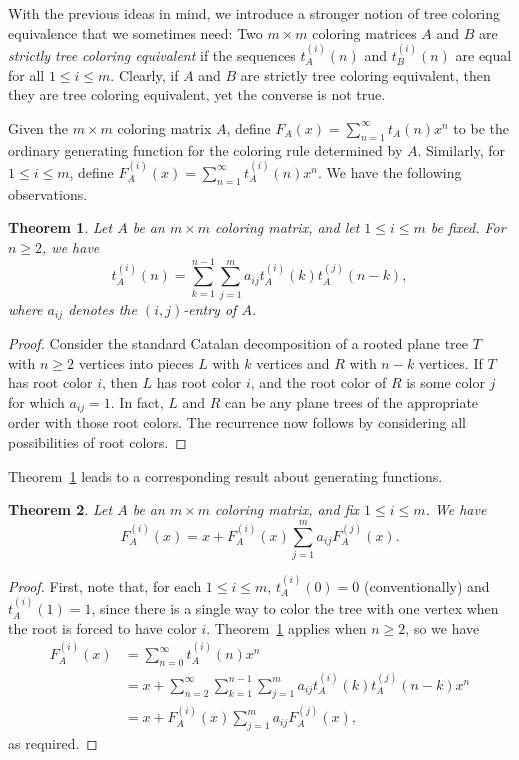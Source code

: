 \documentclass[12pt]{amsart}
\newtheorem{theorem}{Theorem}
\newcommand{\gfll}[1]{F_{#1}(x)}
\newcommand{\gfall}{\gfll{A}}
\newcommand{\gff}[2]{F_{#2}^{(#1)}(x)}
\newcommand{\gfa}[1]{\gff{#1}{A}}
\begin{document}
With the previous ideas in mind, we introduce a stronger notion of tree coloring equivalence that we sometimes need: Two $m\times m$ coloring matrices $A$ and $B$ are \emph{strictly tree coloring equivalent} if the sequences $t_A^{(i)}(n)$ and $t_B^{(i)}(n)$ are equal for all $1\leq i\leq m$. Clearly, if $A$ and $B$ are strictly tree coloring equivalent, then they are tree coloring equivalent, yet the converse is not true.

Given the $m\times m$ coloring matrix $A$, define $\gfall=\sum_{n=1}^\infty t_A(n)x^n$ to be the ordinary generating function for the coloring rule determined by $A$. Similarly, for $1\leq i\leq m$, define $\gfa{i}=\sum_{n=1}^\infty t_A^{(i)}(n)x^n$. We have the following observations.
\begin{theorem}\label{prop:rootrec}
    Let $A$ be an $m\times m$ coloring matrix, and let $1\leq i\leq m$ be fixed. For $n\geq2$, we have
    \[
    t_A^{(i)}(n)=\sum_{k=1}^{n-1}\sum_{j=1}^ma_{ij}t_A^{(i)}(k)t_A^{(j)}(n-k),
    \]
    where $a_{ij}$ denotes the $(i,j)$-entry of $A$.
\end{theorem}
\begin{proof}
    Consider the standard Catalan decomposition of a rooted plane tree $T$ with $n\geq 2$ vertices into pieces $L$ with $k$ vertices and $R$ with $n-k$ vertices. 
    If $T$ has root color $i$, then $L$ has root color $i$, and the root color of $R$ is some color $j$ for which $a_{ij}=1$. In fact, $L$ and $R$ can be any plane trees of the appropriate order with those root colors. 
    The recurrence now follows by considering all possibilities of root colors.
\end{proof}

Theorem~\ref{prop:rootrec} leads to a corresponding result about generating functions.
\begin{theorem}\label{prop:gfgeneral}
    Let $A$ be an $m\times m$ coloring matrix, and fix $1\leq i\leq m$. We have
    \[
    \gfa{i}=x+\gfa{i}\sum_{j=1}^ma_{ij}\gfa{j}.
    \]
\end{theorem}
\begin{proof}
    First, note that, for each $1\leq i\leq m$, $t_A^{(i)}(0)=0$ (conventionally) 
    and $t_A^{(i)}(1)=1$, since there is a single way to color the tree with one vertex when the root is forced to have color $i$. Theorem~\ref{prop:rootrec} applies when $n\geq2$, so we have
    \begin{align*}
        \gfa{i}&=\sum_{n=0}^\infty t_A^{(i)}(n)x^n\\
        &=x+\sum_{n=2}^\infty\sum_{k=1}^{n-1}\sum_{j=1}^ma_{ij}t_A^{(i)}(k)t_A^{(j)}(n-k)x^n\\
        &=x+\gfa{i}\sum_{j=1}^ma_{ij}\gfa{j},
    \end{align*}
    as required.
\end{proof}
\end{document}
